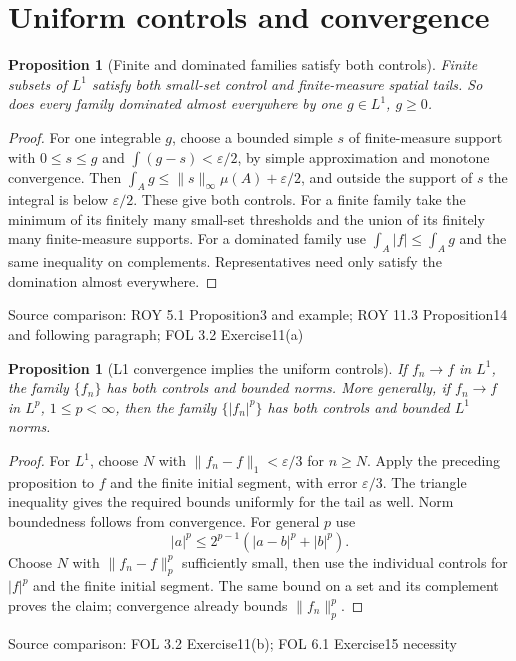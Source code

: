 \documentclass[11pt,oneside,openany]{book}
\newtheorem{proposition}[theorem]{Proposition}
\theoremstyle{definition}
\theoremstyle{remark}
\newcommand{\eps}{\varepsilon}\newcommand{\ee}{\varepsilon}
\newcommand{\family}[1]{}
\newcommand{\source}[1]{\par\begingroup\small\sffamily\color{black!65}Source comparison: #1\par\endgroup}
\begin{document}
\section{Uniform controls and convergence}

\begin{proposition}[Finite and dominated families satisfy both controls]\family{D11.17.dominated_and_finite_families}\label{d11:17:dominated-and-finite-families}
Finite subsets of $L^1$ satisfy both small-set control and finite-measure spatial tails. So does every family dominated almost everywhere by one $g\in L^1$, $g\ge0$.
\end{proposition}
\begin{proof}
For one integrable $g$, choose a bounded simple $s$ of finite-measure support with $0\le s\le g$ and $\int(g-s)<\eps/2$, by simple approximation and monotone convergence. Then $\int_Ag\le\|s\|_\infty\mu(A)+\eps/2$, and outside the support of $s$ the integral is below $\eps/2$. These give both controls. For a finite family take the minimum of its finitely many small-set thresholds and the union of its finitely many finite-measure supports. For a dominated family use $\int_A|f|\le\int_Ag$ and the same inequality on complements. Representatives need only satisfy the domination almost everywhere.
\end{proof}
\source{ROY 5.1 Proposition3 and example; ROY 11.3 Proposition14 and following paragraph; FOL 3.2 Exercise11(a)}

\begin{proposition}[L1 convergence implies the uniform controls]\family{D11.17.norm_convergence_controls}\label{d11:17:norm-convergence-controls}
If $f_n\to f$ in $L^1$, the family $\{f_n\}$ has both controls and bounded norms. More generally, if $f_n\to f$ in $L^p$, $1\le p<\infty$, then the family $\{|f_n|^p\}$ has both controls and bounded $L^1$ norms.
\end{proposition}
\begin{proof}
For $L^1$, choose $N$ with $\|f_n-f\|_1<\eps/3$ for $n\ge N$. Apply the preceding proposition to $f$ and the finite initial segment, with error $\eps/3$. The triangle inequality gives the required bounds uniformly for the tail as well. Norm boundedness follows from convergence. For general $p$ use
\[|a|^p\le2^{p-1}(|a-b|^p+|b|^p).\]
Choose $N$ with $\|f_n-f\|_p^p$ sufficiently small, then use the individual controls for $|f|^p$ and the finite initial segment. The same bound on a set and its complement proves the claim; convergence already bounds $\|f_n\|_p^p$.
\end{proof}
\source{FOL 3.2 Exercise11(b); FOL 6.1 Exercise15 necessity}
\end{document}
